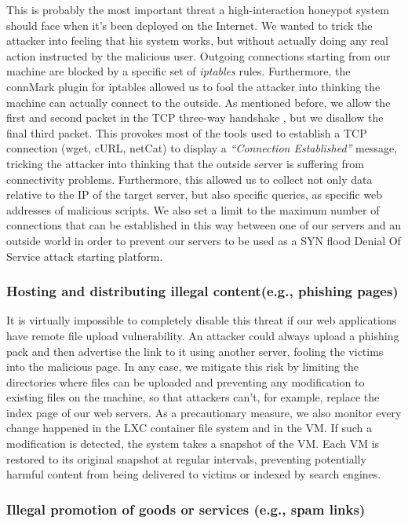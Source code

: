  This is probably the most important threat a high-interaction honeypot system should face when it's been deployed on the Internet. We wanted to trick the attacker into feeling that his system works, but without actually doing any real action instructed by the malicious user. Outgoing connections starting from our machine are blocked by a specific set of \emph{iptables} rules. Furthermore, the connMark plugin for iptables allowed us to fool the attacker into thinking the machine can actually connect to the outside. As mentioned before, we allow the first and second packet in the TCP three-way handshake , but we disallow the final third packet. This provokes most of the tools used to establish a TCP connection (wget, cURL, netCat) to display a \emph{``Connection Established''} message, tricking the attacker into thinking that the outside server is suffering from connectivity problems. Furthermore, this allowed us to collect not only data relative to the IP of the target server, but also specific queries, as specific web addresses of malicious scripts. We also set a limit to the maximum number of connections that can be established in this way between one of our servers and an outside world in order to prevent our servers to be used as a SYN flood Denial Of Service attack starting platform.

\subsubsection{Hosting and distributing illegal content(e.g., phishing pages)}

 It is virtually impossible to completely disable this threat if our web applications have remote file upload vulnerability. An attacker could always upload a phishing pack and then advertise the link to it using another server, fooling the victims into the malicious page. In any case, we mitigate this risk by limiting the directories where files can be uploaded and preventing any modification to existing files on the machine, so that attackers can't, for example, replace the index page of our web servers. As a precautionary measure, we also monitor every change happened in the LXC container file system and in the VM. If such a modification is detected, the system takes a snapshot of the VM. Each VM is restored to its original snapshot at regular intervals, preventing potentially harmful content from being delivered to victims or indexed by search engines.

\subsubsection{Illegal promotion of goods or services (e.g., spam links)}

